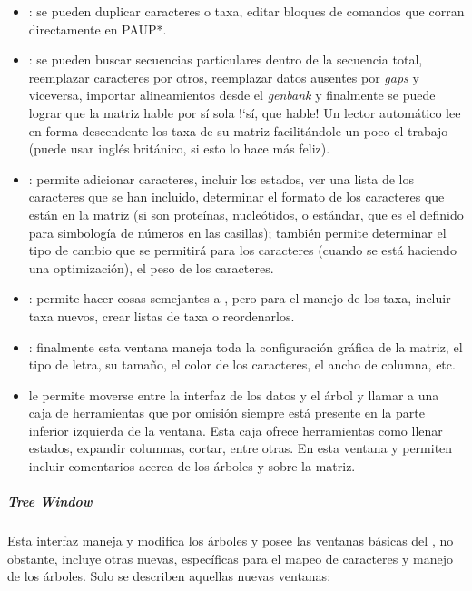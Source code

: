 \begin{itemize}
	\item {}: se pueden duplicar caracteres o taxa, editar bloques de comandos que corran directamente en PAUP*.
	\item {}: se pueden buscar secuencias particulares dentro de la secuencia total, reemplazar caracteres por otros, reemplazar datos ausentes por \textit{gaps} y viceversa, importar alineamientos desde el \textit{genbank} y finalmente se puede lograr que la matriz hable por s\'i sola !`s\'i, que hable! Un lector autom\'atico lee en forma descendente los taxa de su matriz facilit\'andole un poco el trabajo (puede usar ingl\'es brit\'anico, si esto lo hace m\'as feliz).
	\item {}: permite adicionar caracteres, incluir los estados, ver una lista de los caracteres que se han incluido, determinar el formato de los caracteres que est\'an en la matriz (si son prote\'inas, nucle\'otidos, o est\'andar, que es el definido para simbolog\'ia de n\'umeros en las casillas); tambi\'en permite determinar el tipo de cambio que se permitir\'a para los caracteres (cuando se est\'a haciendo una optimizaci\'on), el peso de los caracteres.
	\item {}: permite hacer cosas semejantes a , pero para el manejo de los taxa, incluir taxa nuevos, crear listas de taxa o reordenarlos.
	\item {}: finalmente esta ventana maneja toda la configuraci\'on gr\'afica de la matriz, el tipo de letra, su tama\~no, el color de los caracteres, el ancho de columna, etc.
	\item {} le permite moverse entre la interfaz de los datos y el \'arbol y llamar a una caja de herramientas que por omisi\'on siempre est\'a presente en la parte inferior izquierda de la ventana. Esta caja ofrece herramientas como llenar estados, expandir columnas, cortar, entre otras. En esta ventana  y  permiten incluir comentarios acerca de los \'arboles y sobre la matriz.
\end{itemize}


\subparagraph*{Tree Window}
Esta interfaz maneja y modifica los \'arboles y posee las ventanas b\'asicas del , no obstante, incluye otras nuevas, espec\'ificas para el mapeo de caracteres y manejo de los \'arboles. Solo se describen aquellas nuevas ventanas:

